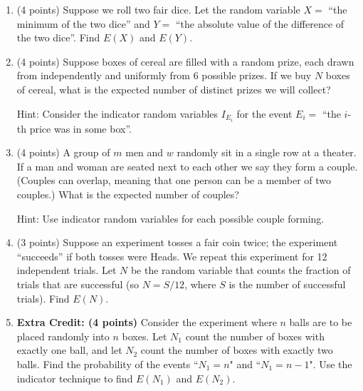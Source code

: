 \documentclass[11pt]{article}
\begin{document}
\begin{enumerate}
\item (4 points) Suppose we roll two fair dice.  Let the random variable $X=$
``the minimum of the two dice'' and $Y =$ ``the absolute value of the
difference of the two dice''.  Find $E(X)$ and $E(Y)$.

\item (4 points) Suppose boxes of cereal are filled with a random prize,
each drawn from independently and uniformly from $6$ possible prizes.
If we buy $N$ boxes of cereal, what is the expected number of distinct
prizes we will collect? \begin{small}\textsf{Hint: Consider the indicator
random variables $I_{E_i}$ for the event $E_i =$ ``the $i$-th price was
in some box''.}\end{small}

\item (4 points) A group of $m$ men and $w$ randomly sit in a single row at a
theater.  If a man and woman are seated next to each other we say they form a
couple.  (Couples can overlap, meaning that one person can be a member of two
couples.)  What is the expected number of couples?
\begin{small}\textsf{Hint: Use indicator
random variables for each possible couple forming.
}\end{small}

\item (3 points) Suppose an experiment tosses a fair coin twice;  the experiment
``succeeds'' if both tosses were Heads.  We repeat this experiment 
for 12 independent trials.  Let $N$ be the random variable that counts
the fraction of trials that are successful (so $N = S/12$, where
$S$ is the number of successful trials).  Find $E(N)$.

\item \textbf{Extra Credit: (4 points)} Consider the experiment where $n$ balls
are to be placed randomly into $n$ boxes. Let $N_1$ count the number of boxes
with exactly one ball, and let $N_2$ count the number of boxes with exactly two
balls. Find the probability of the events ``$N_1 = n$" and ``$N_1 = n - 1$".
Use the indicator technique to find $E(N_1)$ and $E(N_2)$.


\end{enumerate}
\end{document}
